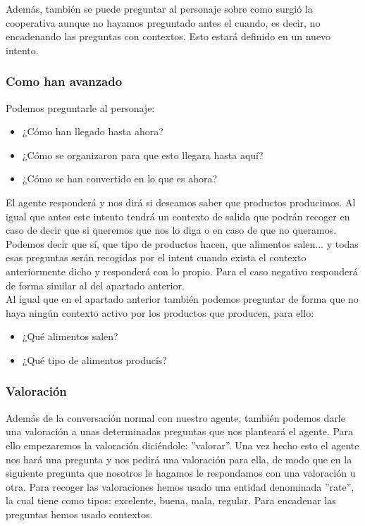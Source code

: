 Además, también se puede preguntar al personaje sobre como surgió la cooperativa aunque no hayamos preguntado antes el cuando, es decir, no encadenando las preguntas con contextos. Esto estará definido en un nuevo intento.


\subsubsection{Como han avanzado}
Podemos preguntarle al personaje:
\begin{itemize}
	\item ¿Cómo han llegado hasta ahora?
	\item ¿Cómo se organizaron para que esto llegara hasta aquí?
	\item ¿Cómo se han convertido en lo que es ahora?	
\end{itemize}

El agente responderá y nos dirá si deseamos saber que productos producimos. Al igual que antes este intento tendrá un contexto de salida que podrán recoger en caso de decir que si queremos que nos lo diga o en caso de que no queramos. \\

Podemos decir que sí, que tipo de productos hacen, que alimentos salen... y todas esas preguntas serán recogidas por el intent cuando exista el contexto anteriormente dicho y responderá con lo propio. Para el caso negativo responderá de forma similar al del apartado anterior. \\

Al igual que en el apartado anterior también podemos preguntar de forma que no haya ningún contexto activo por los productos que producen, para ello:

\begin{itemize}
	\item ¿Qué alimentos salen?
	\item ¿Qué tipo de alimentos producís?
\end{itemize} 

\subsubsection{Valoración}

Además de la conversación normal con nuestro agente, también podemos darle una valoración a unas determinadas preguntas que nos planteará el agente. Para ello empezaremos la valoración diciéndole: ''valorar''. Una vez hecho esto el agente nos hará una pregunta y nos pedirá una valoración para ella, de modo que en la siguiente pregunta que nosotros le hagamos le respondamos con una valoración u otra. Para recoger las valoraciones hemos usado una entidad denominada ''rate'', la cual tiene como tipos: excelente, buena, mala, regular. Para encadenar las preguntas hemos usado contextos. \\

